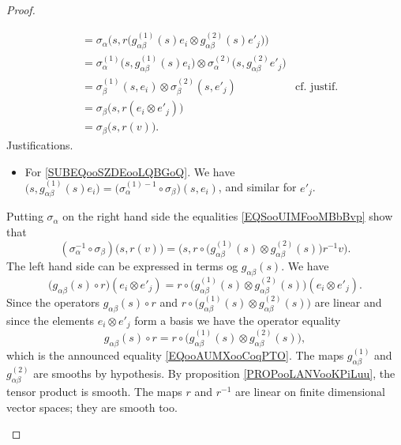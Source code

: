 \begin{proof}
\begin{subproof}
\begin{subproof}
\begin{subequations}
\begin{align}
					 & =\sigma_{\alpha}\Big( s,r\big( g_{\alpha\beta}^{(1)}(s)e_i\otimes g_{\alpha\beta}^{(2)}(s)e'_j \big) \Big)                                                                             \\
					 & = \sigma_{\alpha}^{(1)}\big( s,g_{\alpha\beta}^{(1)}(s)e_i \big)\otimes \sigma_{\alpha}^{(2)}\big( s,g_{\alpha\beta}^{(2)}e'_j \big)                                                   \\
					 & = \sigma_{\beta}^{(1)}(s,e_i)\otimes \sigma_{\beta}^{(2)}(s,e'_j)                                                                    & \text{cf. justif.}  \label{SUBEQooSZDEooLQBGoQ} \\
					 & =\sigma_{\beta}\big( s,r(e_i\otimes e'_j) \big)                                                                                                                                        \\
					 & =\sigma_{\beta}\big( s,r(v) \big).
				\end{align}
			\end{subequations}
			Justifications.
			\begin{itemize}
				\item
				      For \eqref{SUBEQooSZDEooLQBGoQ}. We have \( \big( s,g_{\alpha\beta}^{(1)}(s)e_i \big)=\big( \sigma_{\alpha}^{(1)-1}\circ \sigma_{\beta} \big)(s,e_i)\), and similar for \( e'_j\).
			\end{itemize}
			Putting \( \sigma_{\alpha}\) on the right hand side the equalities \eqref{EQSooUIMFooMBbBvp} show that
			\begin{equation}
				(\sigma_{\alpha}^{-1}\circ \sigma_{\beta})\big( s,r(v) \big)=\Big( s,r\circ\big( g_{\alpha\beta}^{(1)}(s)\otimes g_{\alpha\beta}^{(2)}(s) \big)r^{-1}v \Big).
			\end{equation}
			The left hand side can be expressed in terms og \( g_{\alpha\beta}(s)\). We have
			\begin{equation}
				\big( g_{\alpha\beta}(s)\circ r \big)(e_i\otimes e'_j)=r\circ \big( g_{\alpha\beta}^{(1)}(s)\otimes g_{\alpha\beta}^{(2)}(s) \big)(e_i\otimes e'_j).
			\end{equation}
			Since the operators \( g_{\alpha\beta}(s)\circ r\) and \( r\circ\big(   g_{\alpha\beta}^{(1)}(s)\otimes g_{\alpha\beta}^{(2)}(s) \big)\) are linear and since the elements \( e_i\otimes e'_j\) form a basis we have the operator equality
			\begin{equation}
				g_{\alpha\beta}(s)\circ r=r\circ \big( g_{\alpha\beta}^{(1)}(s)\otimes g_{\alpha\beta}^{(2)}(s) \big),
			\end{equation}
			which is the announced equality \eqref{EQooAUMXooCoqPTO}.
			\spitem[Conclusion]
			The maps \( g_{\alpha\beta}^{(1)}\) and \( g_{\alpha\beta}^{(2)}\) are smooths by hypothesis. By proposition \ref{PROPooLANVooKPiLuu}, the tensor product is smooth. The maps \( r\) and \( r^{-1}\) are linear on finite dimensional vector spaces; they are smooth too.
		\end{subproof}
	\end{subproof}
\end{proof}

